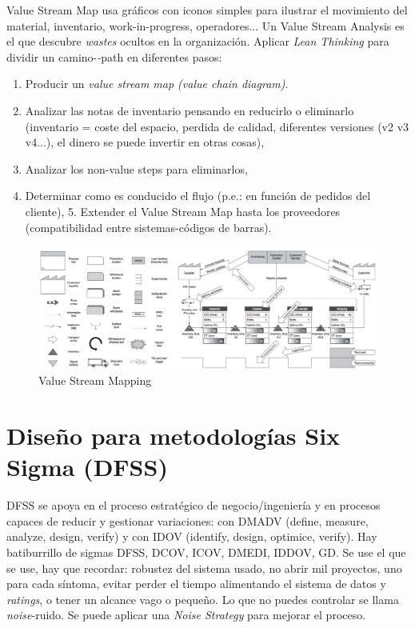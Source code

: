 \documentclass[oneside]{book}
\begin{document}
Value Stream Map usa gráficos con iconos simples para ilustrar el movimiento del material, inventario, work-in-progress, operadores... Un Value Stream Analysis es el que descubre \textit{wastes} ocultos en la organización. Aplicar \textit{Lean Thinking} para dividir un camino-\textit-{path} en diferentes pasos: \begin{enumerate} \item Producir un \textit{value stream map (value chain diagram)}. \item Analizar las notas de inventario pensando en reducirlo o eliminarlo (inventario = coste del espacio, perdida de calidad, diferentes versiones (v2 v3 v4...), el dinero se puede invertir en otras cosas), \item Analizar los non-value steps para eliminarlos, \item Determinar como es conducido el flujo (p.e.: en función de pedidos del cliente), 5. Extender el Value Stream Map hasta los proveedores (compatibilidad entre sistemas-códigos de barras). \end{enumerate}

\begin{figure}[ht!]
	\centering
	\includegraphics[width=170mm]{imagenes/ValueStreamMapping.png}
	\caption{Value Stream Mapping}
	\label{fig:ValueStreamMapping}
\end{figure}

\chapter{Diseño para metodologías Six Sigma (DFSS)}

DFSS se apoya en el proceso estratégico de negocio/ingeniería y en procesos capaces de reducir y gestionar variaciones: con DMADV (define, measure, analyze, design, verify) y con IDOV (identify, design, optimice, verify). Hay batiburrillo de sigmas DFSS, DCOV, ICOV, DMEDI, IDDOV, GD. Se use el que se use, hay que recordar: robustez del sistema usado, no abrir mil proyectos, uno para cada síntoma, evitar perder el tiempo alimentando el sistema de datos y \textit{ratings}, o tener un alcance vago o pequeño. Lo que no puedes controlar se llama \textit{noise}-ruido. Se puede aplicar una \textit{Noise Strategy} para mejorar el proceso.
\end{document}

